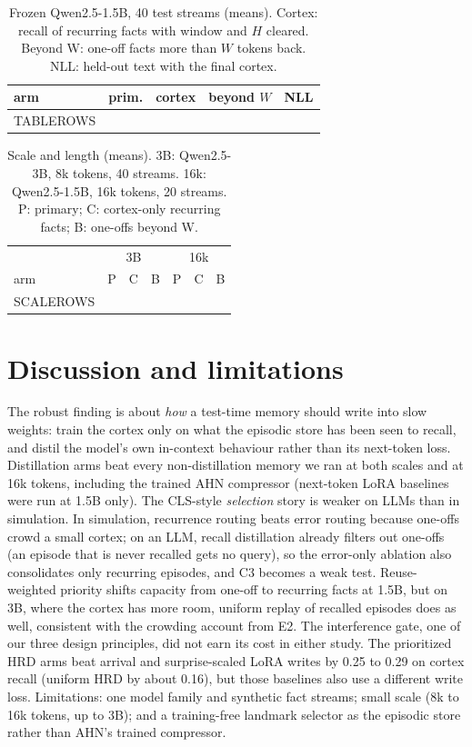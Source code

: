 \documentclass[letterpaper,10pt,twocolumn]{article}
\begin{document}
\begin{table}[t]
\centering\small
\caption{Frozen Qwen2.5-1.5B, 40 test streams (means). Cortex: recall of recurring facts with window and $H$ cleared. Beyond W: one-off facts more than $W$ tokens back. NLL: held-out text with the final cortex.}
\label{tab:neural}
\footnotesize\setlength{\tabcolsep}{3pt}
\begin{tabular}{@{}lcccc@{}}
\toprule
arm & prim. & cortex & beyond $W$ & NLL\\
\midrule
TABLEROWS
\bottomrule
\end{tabular}
\end{table}

\begin{table}[t]
\centering\small
\caption{Scale and length (means). 3B: Qwen2.5-3B, 8k tokens, 40 streams. 16k: Qwen2.5-1.5B, 16k tokens, 20 streams. P: primary; C: cortex-only recurring facts; B: one-offs beyond W.}
\label{tab:scale}
\footnotesize\setlength{\tabcolsep}{2.2pt}
\begin{tabular}{@{}lcccccc@{}}
\toprule
& \multicolumn{3}{c}{3B} & \multicolumn{3}{c}{16k}\\
arm & P & C & B & P & C & B\\
\midrule
SCALEROWS
\bottomrule
\end{tabular}
\end{table}

\section{Discussion and limitations}
The robust finding is about \emph{how} a test-time memory should write into slow weights: train the cortex only on what the episodic store has been seen to recall, and distil the model's own in-context behaviour rather than its next-token loss. Distillation arms beat every non-distillation memory we ran at both scales and at 16k tokens, including the trained AHN compressor (next-token LoRA baselines were run at 1.5B only). The CLS-style \emph{selection} story is weaker on LLMs than in simulation. In simulation, recurrence routing beats error routing because one-offs crowd a small cortex; on an LLM, recall distillation already filters out one-offs (an episode that is never recalled gets no query), so the error-only ablation also consolidates only recurring episodes, and C3 becomes a weak test. Reuse-weighted priority shifts capacity from one-off to recurring facts at 1.5B, but on 3B, where the cortex has more room, uniform replay of recalled episodes does as well, consistent with the crowding account from E2. The interference gate, one of our three design principles, did not earn its cost in either study. The prioritized HRD arms beat arrival and surprise-scaled LoRA writes by 0.25 to 0.29 on cortex recall (uniform HRD by about 0.16), but those baselines also use a different write loss. Limitations: one model family and synthetic fact streams; small scale (8k to 16k tokens, up to 3B); and a training-free landmark selector as the episodic store rather than AHN's trained compressor.
\end{document}
